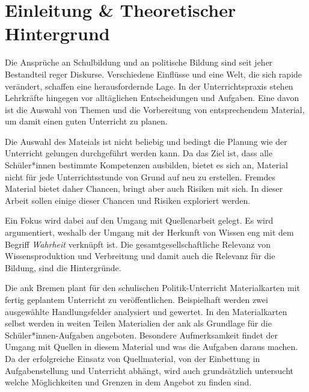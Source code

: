 



\section{Einleitung \& Theoretischer Hintergrund}
Die Ansprüche an Schulbildung und an politische Bildung sind seit jeher Bestandteil reger Diskurse. Verschiedene Einflüsse und eine Welt, die sich rapide verändert, schaffen eine herausfordernde Lage. In der Unterrichtspraxis stehen Lehrkräfte hingegen vor alltäglichen Entscheidungen und Aufgaben. Eine davon ist die Auswahl von Themen und die Vorbereitung von entsprechendem Material, um damit einen guten Unterricht zu planen. 

Die Auswahl des Mateials ist nicht beliebig und bedingt die Planung wie der Unterricht gelungen durchgeführt werden kann. Da das Ziel ist, dass alle Schüler*innen bestimmte Kompetenzen ausbilden, bietet es sich an, Material nicht für jede Unterrichtsstunde von Grund auf neu zu erstellen. 
Fremdes Material bietet daher Chancen, bringt aber auch Risiken mit sich. In dieser Arbeit sollen einige dieser Chancen und Risiken exploriert werden. 

Ein Fokus wird dabei auf den Umgang mit Quellenarbeit gelegt. Es wird argumentiert, weshalb der Umgang mit der Herkunft von Wissen eng mit dem Begriff \emph{Wahrheit} verknüpft ist. Die gesamtgesellschaftliche Relevanz von Wissensproduktion und Verbreitung und damit auch die Relevanz für die Bildung, sind die Hintergründe.
\bigskip

Die \gls{ank} Bremen plant für den schulischen Politik-Unterricht Materialkarten mit fertig geplantem Unterricht zu veröffentlichen.
Beispielhaft werden zwei ausgewählte Handlungsfelder analysiert und gewertet. In den Materialkarten selbst werden in weiten Teilen Materialien der \gls{ank} als Grundlage für die Schüler*innen-Aufgaben angeboten. Besondere Aufmerksamkeit findet der Umgang mit Quellen in diesem Material und was die Aufgaben daraus machen. 
Da der erfolgreiche Einsatz von Quellmaterial, von der Einbettung in Aufgabenstellung und Unterricht abhängt, wird auch grundsätzlich untersucht welche Möglichkeiten und Grenzen in dem Angebot zu finden sind. 



